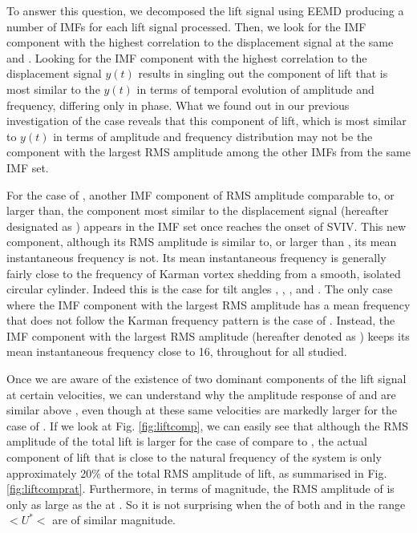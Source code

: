 \documentclass[a4paper]{article}
\begin{document}
To answer this question, we decomposed the lift signal using EEMD producing a number of IMFs for each lift signal processed. Then, we look for the IMF component with the highest correlation to the displacement signal at the same \ptlt{} and \ured{}. Looking for the IMF component with the highest correlation to the displacement signal $y(t)$ results in singling out the component of lift that is most similar to the $y(t)$ in terms of temporal evolution of amplitude and frequency, differing only in phase. What we found out in our previous investigation of the \ptlt{} \es{} \rfo{} case reveals that this component of lift, which is most similar to $y(t)$ in terms of amplitude and frequency distribution may not be the component with the largest RMS amplitude among the other IMFs from the same IMF set.

For the case of \ptlt{} \es{} \rfo{}, another IMF component of RMS amplitude comparable to, or larger than, the component most similar to the displacement signal (hereafter designated as \cflyt{}) appears in the IMF set once \ured{} reaches the onset of SVIV. This new component, although its RMS amplitude is similar to, or larger than \cflyt{}, its mean instantaneous frequency is not. Its mean instantaneous frequency is generally fairly close to the frequency of Karman vortex shedding from a smooth, isolated circular cylinder. Indeed this is the case for tilt angles \ptlt{} \es{} \rze{}, \ron{}, \rth{}, and \rfo{}. The only case where the IMF component with the largest RMS amplitude has a mean frequency that does not follow the Karman frequency pattern is the case of \ptlt{} \es{} \rtw{}. Instead, the IMF component with the largest RMS amplitude (hereafter denoted as \cflm{}) keeps its mean instantaneous frequency close to \unit{16}{\hertz}, throughout for all \ured{} studied.  

Once we are aware of the existence of two dominant components of the lift signal at certain velocities, we can understand why the amplitude response of \ptlt{} \es{} \rtw{} and \rth{} are similar above \ured{} \es{} \urfi{}, even though \flrms{} at these same velocities are markedly larger for the case of \rth{}. If we look at Fig. \ref{fig:liftcomp}, we can easily see that although the RMS amplitude of the total lift is larger for the case of \ptlt{} \es{} \rth{} compare to \ptlt{} \es{} \rtw{}, the actual component of lift that is close to the natural frequency of the system is only approximately 20\% of the total RMS amplitude of lift, as summarised in Fig. \ref{fig:liftcomprat}. Furthermore, in terms of magnitude, the RMS amplitude of \cflyt{} is only as large as the \cflyt{} at \ptlt{} \es{} \rtw{}. So it is not surprising when the \yrms{} of both \ptlt{} \es{} \rtw{} and \rth{} in the range \urfi{} $< U^{*} <$ \urtt{} are of similar magnitude.
\end{document}
